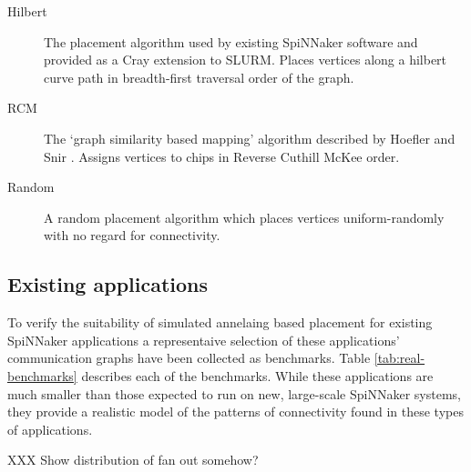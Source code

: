 			\begin{description}
				
				\item[Hilbert] The placement algorithm used by existing SpiNNaker
				software and provided as a Cray extension to SLURM. Places vertices
				along a hilbert curve path in breadth-first traversal order of the
				graph.
				
				\item[RCM] The `graph similarity based mapping' algorithm described by
				Hoefler and Snir \cite{hoefler11}. Assigns vertices to chips in Reverse
				Cuthill McKee order.
				
				\item[Random] A random placement algorithm which places vertices
				uniform-randomly with no regard for connectivity.
				
			\end{description}
			
		\subsection{Existing applications}
			
			\label{sec:existing-applications}
			
			To verify the suitability of simulated annelaing based placement for
			existing SpiNNaker applications a representaive selection of these
			applications' communication graphs have been collected as benchmarks.
			Table \ref{tab:real-benchmarks} describes each of the benchmarks.  While
			these applications are much smaller than those expected to run on new,
			large-scale SpiNNaker systems, they provide a realistic model of the
			patterns of connectivity found in these types of applications.
			
			XXX Show distribution of fan out somehow?
			
